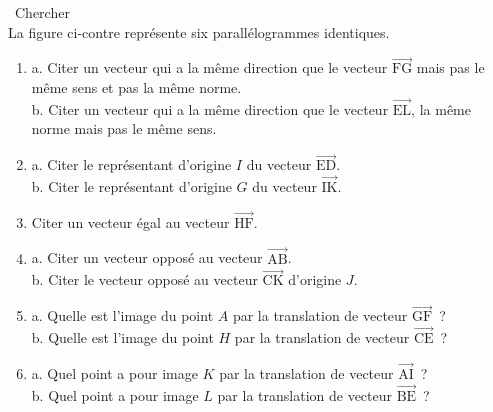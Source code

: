 \documentclass[11pt,a4paper]{article}
\newcommand{\starfull}[1]{{\color{#1}\ding{72}}}
\newcommand{\starempty}{{\color{gray!45}\ding{73}}}
\newcommand{\Vj}[1]{\overrightarrow{\text{#1}}}
\newcommand{\Jtag}{\par\vspace{2pt}{\raggedleft\scriptsize\itshape\color{jimmycolor}Fiches Jimmy\par}}
\begin{document}
\begin{tcolorbox}[boxrule=0.8pt,colframe=black,colback=white,arc=2pt,left=6pt,right=6pt,top=5pt,bottom=5pt]
\ \starempty\starempty\starfull{diffred}\hfill{\color{gray!40!black}Chercher}\\
La figure ci-contre repr\'esente six parall\'elogrammes identiques.
\begin{center}
\end{center}
\begin{enumerate}
\item[1.] a. Citer un vecteur qui a la m\^eme direction que le vecteur $\Vj{FG}$ mais pas le m\^eme sens et pas la m\^eme norme.\\
b. Citer un vecteur qui a la m\^eme direction que le vecteur $\Vj{EL}$, la m\^eme norme mais pas le m\^eme sens.
\item[2.] a. Citer le repr\'esentant d'origine $I$ du vecteur $\Vj{ED}$.\\
b. Citer le repr\'esentant d'origine $G$ du vecteur $\Vj{IK}$.
\item[3.] Citer un vecteur \'egal au vecteur $\Vj{HF}$.
\item[4.] a. Citer un vecteur oppos\'e au vecteur $\Vj{AB}$.\\
b. Citer le vecteur oppos\'e au vecteur $\Vj{CK}$ d'origine $J$.
\item[5.] a. Quelle est l'image du point $A$ par la translation de vecteur $\Vj{GF}$~?\\
b. Quelle est l'image du point $H$ par la translation de vecteur $\Vj{CE}$~?
\item[6.] a. Quel point a pour image $K$ par la translation de vecteur $\Vj{AI}$~?\\
b. Quel point a pour image $L$ par la translation de vecteur $\Vj{BE}$~?
\end{enumerate}
\Jtag
\end{tcolorbox}
\end{document}
